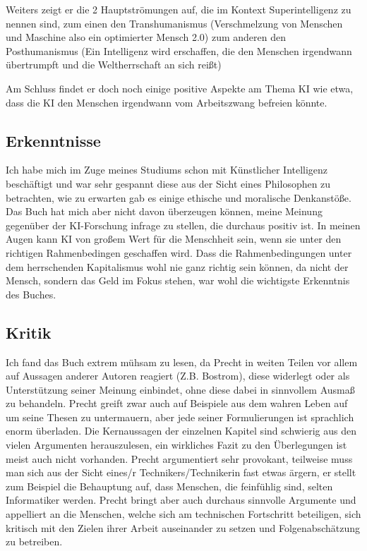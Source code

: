 \documentclass[twoside, a4paper, DIV=11, open=any, bibliography=totoc]{scrbook}
\begin{document}
Weiters zeigt er die 2 Hauptströmungen auf, die im Kontext Superintelligenz zu nennen sind, zum einen den Transhumanismus (Verschmelzung von Menschen und Maschine also ein optimierter Mensch 2.0) zum anderen den Posthumanismus (Ein Intelligenz wird erschaffen, die den Menschen irgendwann übertrumpft und die Weltherrschaft an sich reißt) \par
Am Schluss findet er doch noch einige positive Aspekte am Thema KI wie etwa, dass die KI den Menschen irgendwann vom Arbeitszwang befreien könnte.




\subsection{Erkenntnisse} \label{sec:literkenntnis3}
Ich habe mich im Zuge meines Studiums schon mit Künstlicher Intelligenz beschäftigt und war sehr gespannt diese aus der Sicht eines Philosophen zu betrachten, wie zu erwarten gab es einige ethische und moralische Denkanstöße. Das Buch hat mich aber nicht davon überzeugen können, meine Meinung gegenüber der KI-Forschung infrage zu stellen, die durchaus positiv ist. In meinen Augen kann KI von großem Wert für die Menschheit sein, wenn sie unter den richtigen Rahmenbedingen geschaffen wird. Dass die Rahmenbedingungen unter dem herrschenden Kapitalismus wohl nie ganz richtig sein können, da nicht der Mensch, sondern das Geld im Fokus stehen, war wohl die wichtigste Erkenntnis des Buches.

\subsection{Kritik} \label{sec:litkritik3}
Ich fand das Buch extrem mühsam zu lesen, da Precht in weiten Teilen vor allem auf Aussagen anderer Autoren reagiert (Z.B. Bostrom), diese widerlegt oder als Unterstützung seiner Meinung einbindet, ohne diese dabei in sinnvollem Ausmaß zu behandeln. Precht greift zwar auch auf Beispiele aus dem wahren Leben auf um seine Thesen zu untermauern, aber jede seiner Formulierungen ist sprachlich enorm überladen. Die Kernaussagen der einzelnen Kapitel sind schwierig aus den vielen Argumenten herauszulesen, ein wirkliches Fazit zu den Überlegungen ist meist auch nicht vorhanden. Precht argumentiert sehr provokant, teilweise muss man sich aus der Sicht eines/r Technikers/Technikerin fast etwas ärgern, er stellt zum Beispiel die Behauptung auf, dass Menschen, die feinfühlig sind, selten Informatiker werden. Precht bringt aber auch durchaus sinnvolle Argumente und appelliert an die Menschen, welche sich am technischen Fortschritt beteiligen, sich kritisch mit den Zielen ihrer Arbeit auseinander zu setzen und Folgenabschätzung zu betreiben.
\end{document}
